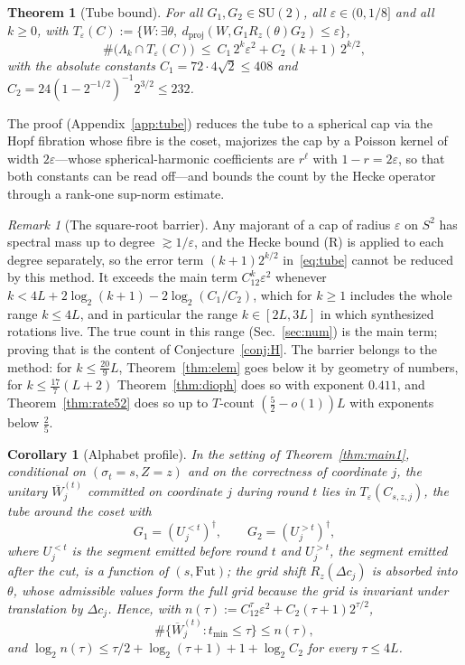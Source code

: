 \documentclass[aps,prx,twocolumn,superscriptaddress,nofootinbib,longbibliography]{revtex4-2}
\theoremstyle{plain}
\newtheorem{theorem}{Theorem}
\newtheorem{corollary}{Corollary}
\theoremstyle{definition}
\theoremstyle{remark}
\newtheorem{remark}{Remark}
\newcommand{\dproj}{d_{\mathrm{proj}}}
\newcommand{\SU}{\mathrm{SU}(2)}
\begin{document}
\begin{theorem}[Tube bound]\label{thm:tube}
For all $G_1,G_2\in\SU$, all $\varepsilon\in(0,1/8]$ and all $k\ge0$, with
$T_\varepsilon(C):=\{W:\exists\theta,\ \dproj(W,G_1R_z(\theta)G_2)\le\varepsilon\}$,
\begin{equation}\label{eq:tube}
\#\big(\Lambda_k\cap T_\varepsilon(C)\big)\ \le\ C_1\,2^k\varepsilon^2+C_2\,(k+1)\,2^{k/2},
\end{equation}
with the absolute constants $C_1=72\cdot4\sqrt2\le408$ and $C_2=24(1-2^{-1/2})^{-1}2^{3/2}\le232$.
\end{theorem}
The proof (Appendix~\ref{app:tube}) reduces the tube to a spherical cap via the Hopf fibration whose fibre is the coset, majorizes the cap by a Poisson kernel of width $2\varepsilon$---whose spherical-harmonic coefficients are $r^\ell$ with $1-r=2\varepsilon$, so that both constants can be read off---and bounds the count by the Hecke operator through a rank-one sup-norm estimate.

\begin{remark}[The square-root barrier]\label{rem:barrier}
Any majorant of a cap of radius $\varepsilon$ on $S^2$ has spectral mass up to degree $\gtrsim1/\varepsilon$, and the Hecke bound (R) is applied to each degree separately, so the error term $(k+1)2^{k/2}$ in~\eqref{eq:tube} cannot be reduced by this method. It exceeds the main term $C_12^k\varepsilon^2$ whenever $k<4L+2\log_2(k+1)-2\log_2(C_1/C_2)$, which for $k\ge1$ includes the whole range $k\le4L$, and in particular the range $k\in[2L,3L]$ in which synthesized rotations live. The true count in this range (Sec.~\ref{sec:num}) is the main term; proving that is the content of Conjecture~\ref{conj:H}. The barrier belongs to the method: for $k\le\tfrac{20}9L$, Theorem~\ref{thm:elem} goes below it by geometry of numbers, for $k\le\tfrac{17}7(L+2)$ Theorem~\ref{thm:dioph} does so with exponent $0.411$, and Theorem~\ref{thm:rate52} does so up to $T$-count $(\tfrac52-o(1))L$ with exponents below $\tfrac25$.
\end{remark}

\begin{corollary}[Alphabet profile]\label{cor:profile}
In the setting of Theorem~\ref{thm:main1}, conditional on $(\sigma_t=s,Z=z)$ and on the correctness of coordinate $j$, the unitary $\overline W^{(t)}_j$ committed on coordinate $j$ during round $t$ lies in $T_\varepsilon(C_{s,z,j})$, the tube around the coset with
\[G_1=(U^{<t}_j)^\dagger,\qquad G_2=(U^{>t}_j)^\dagger,\]
where $U^{<t}_j$ is the segment emitted before round $t$ and $U^{>t}_j$, the segment emitted after the cut, is a function of $(s,\mathrm{Fut})$; the grid shift $R_z(\Delta c_j)$ is absorbed into $\theta$, whose admissible values form the full grid because the grid is invariant under translation by $\Delta c_j$. Hence, with $n(\tau):=C_12^\tau\varepsilon^2+C_2(\tau+1)2^{\tau/2}$,
\[\#\{\overline W^{(t)}_j:t_{\min}\le\tau\}\le n(\tau),\]
and $\log_2n(\tau)\le\tau/2+\log_2(\tau+1)+1+\log_2C_2$ for every $\tau\le4L$.
\end{corollary}
\end{document}
